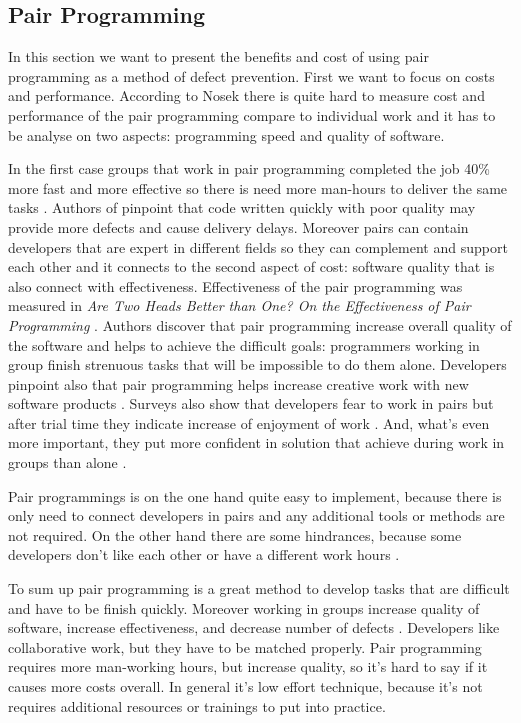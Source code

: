 \subsection*{Pair Programming}

In this section we want to present the benefits and cost of using pair programming as a method of defect prevention. 
First we want to focus on costs and performance.
 According to Nosek \cite{collaborativeProgramming} there is quite hard to measure cost and performance of the pair programming compare to individual work and it has to be analyse on two aspects: programming speed and quality of software. 
 
  In the first case groups that work in pair programming completed the job 40\% more fast and more effective \cite{collaborativeProgramming} so there is need more man-hours to deliver the same tasks \cite{areTwoHeadsBetterThanOne}.  Authors of \cite{collaborativeProgramming} pinpoint that code written quickly with poor quality may provide more defects and cause delivery delays. Moreover pairs can contain developers that are expert in different fields so they can complement and support each other \cite{collaborativeProgramming} and it connects to the second aspect of cost: software quality that is also connect with effectiveness. Effectiveness of the pair programming was measured in \textit{Are Two Heads Better than One? On the Effectiveness of Pair Programming} \cite{collaborativeProgramming}. 
 Authors discover that pair programming increase overall quality of the software and helps to achieve the difficult goals: programmers working in group finish strenuous tasks that will be impossible to do them alone. Developers pinpoint also that pair programming helps increase creative work with new software products \cite{collaborativeProgramming} \cite{pairprogramming}. Surveys also show that developers fear to work in pairs but after trial time they indicate increase of enjoyment of work \cite{pairprogrammingsurvey}. And, what's even more important, they put more confident in solution that achieve during work in groups than alone \cite{pairprogrammingsurvey}. 
 
  Pair programmings is on the one hand quite easy to implement, because there is only need to  connect developers in pairs and any additional tools or methods are not required. On the other hand there are some hindrances, because some developers don't like each other or have a different work hours \cite{pairprogramming}.
 
 To sum up pair programming is a great method to develop tasks that are difficult and have to be finish quickly. Moreover working in groups increase quality of software, increase effectiveness, and decrease number of defects \cite{collaborativeProgramming}. Developers like collaborative work, but they have to be matched properly. Pair programming requires more man-working hours, but increase quality, so it's hard to say if it causes more costs overall. In general it's low effort technique, because it's not requires additional resources or trainings to put into practice.